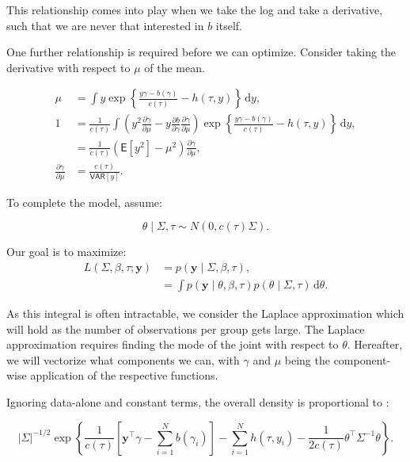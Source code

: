 \documentclass[10pt]{article}
\newcommand{\E}{\mathsf{E}}
\newcommand{\VAR}{\mathsf{VAR}}
\begin{document}
\noindent This relationship comes into play when we take the log and
take a derivative, such that we are never that interested in $b$
itself.

One further relationship is required before we can optimize. Consider taking the
derivative with respect to $\mu$ of the mean.

\begin{align*}
\mu & = \int y \exp\left\{\frac{y \gamma - b(\gamma)}{c(\tau)} - h(\tau, y)\right\}
  \,\mathrm{d}y, \\
1 & = \frac{1}{c(\tau)} \int \left( y^2
  \frac{\partial\gamma}{\partial\mu} - y
  \frac{\partial b}{\partial\gamma}
  \frac{\partial\gamma}{\partial\mu} \right)
   \exp\left\{\frac{y \gamma - b(\gamma)}{c(\tau)} - h(\tau, y)\right\}
  \,\mathrm{d}y, \\
& = \frac{1}{c(\tau)} \left(\E[y^2] - \mu^2\right)\frac{\partial\gamma}{\partial\mu},\\
\frac{\partial\gamma}{\partial\mu} & = \frac{c(\tau)}{\VAR[y]}.
\end{align*}

To complete the model, assume:

\begin{equation*}
\theta \mid \Sigma, \tau \sim N(0, c(\tau)\Sigma).
\end{equation*}

Our goal is to maximize:
\begin{align*}
L(\Sigma, \beta, \tau; \bm{y}) & = p(\bm{y} \mid \Sigma,
\beta, \tau), \\
& = \int p(\bm{y} \mid \theta, \beta, \tau) p(\theta \mid \Sigma,
\tau) \, \mathrm{d}\theta.
\end{align*}

As this integral is often intractable, we consider the Laplace
approximation which will hold as the number of observations per group gets large. The
Laplace approximation requires finding the mode of the joint with
respect to $\theta$. Hereafter, we will vectorize what components we
can, with $\gamma$ and $\mu$ being the component-wise application of
the respective functions.

Ignoring data-alone and constant terms, the overall density is proportional to :

\begin{equation*}
  \left|\Sigma\right|^{-1/2} \exp\left\{\dfrac{1}{c(\tau)}\left[
    \bm{y}^\top\gamma - \sum_{i=1}^Nb(\gamma_i) \right] -
  \sum_{i=1}^Nh(\tau, y_i) - \dfrac{1}{2c(\tau)}\theta^\top\Sigma^{-1}\theta
  \right\}.
\end{equation*}
\end{document}
